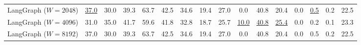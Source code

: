 \begin{table}[t]
\begin{tabular}{
    l|
    *{5}{c}|  %
    *{3}{c}|  %
    *{3}{c}|  %
    *{3}{c}|  %
    c         %
}
LangGraph ($W=2048$)  & \underline{37.0} & 30.0 & 39.3 & 63.7 & 42.5 & 34.6 & 19.4 & 27.0 & 0.0 & 40.8 & 20.4 & 0.0 & \underline{0.5} & 0.2 & 22.5 \\


LangGraph ($W=4096$)  & 31.0 & 35.0 & 41.7 & 59.6 & 41.8 & 32.8 & 18.7 & 25.7 & \underline{10.0} & \underline{40.8} & \underline{25.4} & 0.0 & 0.2 & 0.1 & 23.3 \\


LangGraph ($W=8192$)  & 37.0 & 30.0 & 39.3 & 63.7 & 42.5 & 34.6 & 19.4 & 27.0 & 0.0 & 40.8 & 20.4 & 0.0 & 0.5 & 0.2 & 22.5 \\

\bottomrule
\end{tabular}
\vspace{-4mm}
\end{table}









